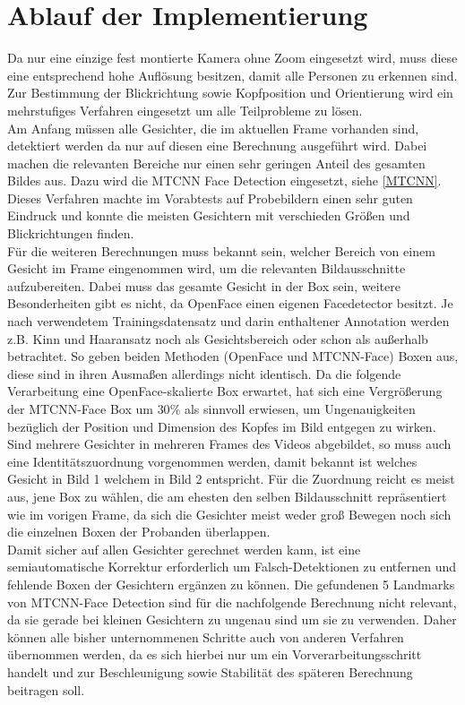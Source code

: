 \section{Ablauf der Implementierung}

Da nur eine einzige fest montierte Kamera ohne Zoom eingesetzt wird, muss diese eine entsprechend hohe Auflösung besitzen, damit alle Personen zu erkennen sind. Zur Bestimmung der Blickrichtung sowie Kopfposition und Orientierung wird ein mehrstufiges Verfahren eingesetzt um alle Teilprobleme zu lösen.\\
Am Anfang müssen alle Gesichter, die im aktuellen Frame vorhanden sind, detektiert werden da nur auf diesen eine Berechnung ausgeführt wird.
Dabei machen die relevanten Bereiche nur einen sehr geringen Anteil des gesamten Bildes aus. Dazu wird die MTCNN Face Detection eingesetzt, siehe \autoref{MTCNN}. Dieses Verfahren machte im Vorabtests auf Probebildern einen sehr guten Eindruck und konnte die meisten Gesichtern mit verschieden Größen und Blickrichtungen finden.\\
Für die weiteren Berechnungen muss bekannt sein, welcher Bereich von einem Gesicht im Frame eingenommen wird, um die relevanten Bildausschnitte aufzubereiten. Dabei muss das gesamte Gesicht in der Box sein, weitere Besonderheiten gibt es nicht, da OpenFace einen eigenen Facedetector besitzt. Je nach verwendetem Trainingsdatensatz und darin enthaltener Annotation werden z.B. Kinn und Haaransatz noch als Gesichtsbereich oder schon als außerhalb betrachtet. So geben beiden Methoden (OpenFace und MTCNN-Face) Boxen aus, diese sind in ihren Ausmaßen allerdings nicht identisch. Da die folgende Verarbeitung eine OpenFace-skalierte Box erwartet, hat sich eine Vergrößerung der MTCNN-Face Box um $30\%$ als sinnvoll erwiesen, um Ungenauigkeiten bezüglich der Position und Dimension des Kopfes im Bild entgegen zu wirken.\\
Sind mehrere Gesichter in mehreren Frames des Videos abgebildet, so muss auch eine Identitätszuordnung vorgenommen werden, damit bekannt ist welches Gesicht in Bild 1 welchem in Bild 2 entspricht. Für die Zuordnung reicht es meist aus, jene Box zu wählen, die am ehesten den selben Bildausschnitt repräsentiert wie im vorigen Frame, da sich die Gesichter meist weder groß Bewegen noch sich die einzelnen Boxen der Probanden überlappen.\\
Damit sicher auf allen Gesichter gerechnet werden kann, ist eine semiautomatische Korrektur erforderlich um Falsch-Detektionen zu entfernen und fehlende Boxen der Gesichtern ergänzen zu können. Die gefundenen 5 Landmarks von MTCNN-Face Detection sind für die nachfolgende Berechnung nicht relevant, da sie gerade bei kleinen Gesichtern zu ungenau sind um sie zu verwenden. Daher können alle bisher unternommenen Schritte auch von anderen Verfahren übernommen werden, da es sich hierbei nur um ein Vorverarbeitungsschritt handelt und zur Beschleunigung sowie Stabilität des späteren Berechnung beitragen soll.\\
